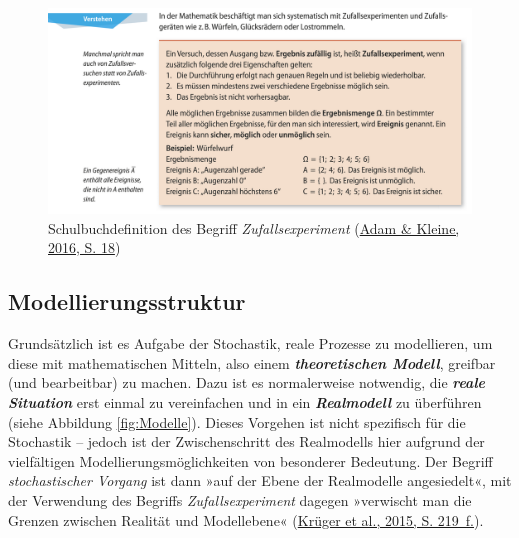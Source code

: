 \documentclass[
]{scrbook}
\theoremstyle{definition}
\theoremstyle{definition}
\theoremstyle{definition}
\theoremstyle{definition}
\theoremstyle{remark}
\begin{document}
\begin{figure}

{\centering \includegraphics[width=0.95\linewidth]{pictures/14-DefinitionZufallsexperiment} 

}

\caption{Schulbuchdefinition des Begriff \emph{Zufallsexperiment} (\protect\hyperlink{ref-Adam2016}{Adam \& Kleine, 2016, S. 18})}\label{fig:DefinitionZufallsexperiment}
\end{figure}

\hypertarget{modellierungsstruktur}{%
\subsection{Modellierungsstruktur}\label{modellierungsstruktur}}

Grundsätzlich ist es Aufgabe der Stochastik, reale Prozesse zu modellieren, um diese mit mathematischen Mitteln, also einem \textbf{\emph{theoretischen Modell}}, greifbar (und bearbeitbar) zu machen. Dazu ist es normalerweise notwendig, die \textbf{\emph{reale Situation}} erst einmal zu vereinfachen und in ein \textbf{\emph{Realmodell}} zu überführen (siehe Abbildung \ref{fig:Modelle}). Dieses Vorgehen ist nicht spezifisch für die Stochastik -- jedoch ist der Zwischenschritt des Realmodells hier aufgrund der vielfältigen Modellierungsmöglichkeiten von besonderer Bedeutung. Der Begriff \emph{stochastischer Vorgang} ist dann »auf der Ebene der Realmodelle angesiedelt«, mit der Verwendung des Begriffs \emph{Zufallsexperiment} dagegen »verwischt man die Grenzen zwischen Realität und Modellebene« (\protect\hyperlink{ref-Kruger2015}{Krüger et al., 2015, S. 219~f.}).
\end{document}
